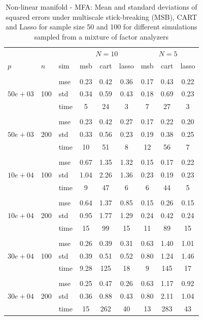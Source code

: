 \documentclass{article} %
\begin{document}
\begin{table}[t]
\caption{Non-linear manifold - MFA: Mean and standard deviations of squared errors under multiscale stick-breaking (MSB), CART and Lasso for sample size 50 and 100 for different simulations sampled from a mixture of factor analyzers}\label{table:mfa}
\vskip 0.15in
\begin{center}
\begin{small}
\begin{sc}
\begin{tabular}{lllcccccc}
\hline
&&&\multicolumn{3}{c}{$N=10$}&\multicolumn{3}{c}{$N=5$}\\
$p$&$n$& sim& msb&cart&lasso & msb&cart&lasso\\
\\
\multirow{3}{*}{$50e+03$}&\multirow{3}{*}{100}&mse&0.23&0.42&0.36&0.17&0.43&0.22\\
&&std & 0.34 &0.59&0.43&0.18&0.69&0.23\\
&&time &5&24 & 3&7&27&3\\

\\
\multirow{3}{*}{$50e+03$}&\multirow{3}{*}{200}&mse&0.23 &0.42 &0.27&0.17&0.22&0.20\\
&&std & 0.33& 0.56&0.23&0.19&0.38&0.25\\
&&time & 10 &51&8&12&56&7\\

\\
\multirow{3}{*}{$10e+04$}&\multirow{3}{*}{100}&mse&0.67&1.35&1.32&0.15&0.17&0.22\\
&&std & 1.04&2.26&1.36&0.23&0.19&0.23\\
&&time &9&47&6&6&44&5\\

\\
\multirow{3}{*}{$10e+04$}&\multirow{3}{*}{200}&mse&0.64&1.37&0.85&0.15&0.26&0.15\\
&&std &0.95 &1.77&1.29&0.24&0.42&0.24\\
&&time &15&99&15&11&89&15\\
\\
\multirow{3}{*}{$30e+04$}&\multirow{3}{*}{100}&mse& 0.26&0.39&0.31&0.63&1.40&1.01\\
&&std &0.39&0.51&0.52&0.80 &1.24& 1.46 \\
&&time &9.28&125&18&9 &145& 17\\
\\
\multirow{3}{*}{$30e+04$}&\multirow{3}{*}{200}&mse&0.25&0.47&0.26&0.63&1.17&0.92\\
&&std &0.36&0.88&0.43 & 0.80&2.11&1.04 \\
&&time &15&262&40&13&283&43\\



\end{tabular}
\end{sc}
\end{small}
\end{center}
\end{table}
\end{document}
